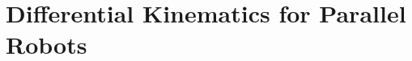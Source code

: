 \documentclass[robotics,article,submit,moreauthors,pdftex]{Definitions/mdpi}
\begin{document}
\section{Differential Kinematics for Parallel Robots}
\label{sec:ZB_Anwendung}

\end{document}
